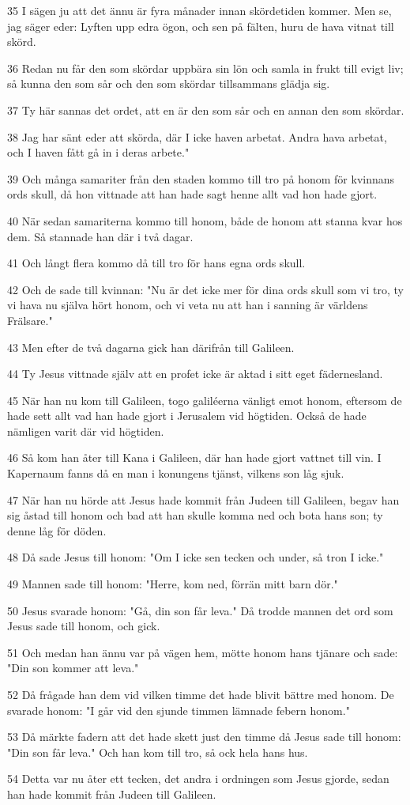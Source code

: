 \par 35 I sägen ju att det ännu är fyra månader innan skördetiden kommer. Men se, jag säger eder: Lyften upp edra ögon, och sen på fälten, huru de hava vitnat till skörd.
\par 36 Redan nu får den som skördar uppbära sin lön och samla in frukt till evigt liv; så kunna den som sår och den som skördar tillsammans glädja sig.
\par 37 Ty här sannas det ordet, att en är den som sår och en annan den som skördar.
\par 38 Jag har sänt eder att skörda, där I icke haven arbetat. Andra hava arbetat, och I haven fått gå in i deras arbete."
\par 39 Och många samariter från den staden kommo till tro på honom för kvinnans ords skull, då hon vittnade att han hade sagt henne allt vad hon hade gjort.
\par 40 När sedan samariterna kommo till honom, både de honom att stanna kvar hos dem. Så stannade han där i två dagar.
\par 41 Och långt flera kommo då till tro för hans egna ords skull.
\par 42 Och de sade till kvinnan: "Nu är det icke mer för dina ords skull som vi tro, ty vi hava nu själva hört honom, och vi veta nu att han i sanning är världens Frälsare."
\par 43 Men efter de två dagarna gick han därifrån till Galileen.
\par 44 Ty Jesus vittnade själv att en profet icke är aktad i sitt eget fädernesland.
\par 45 När han nu kom till Galileen, togo galiléerna vänligt emot honom, eftersom de hade sett allt vad han hade gjort i Jerusalem vid högtiden. Också de hade nämligen varit där vid högtiden.
\par 46 Så kom han åter till Kana i Galileen, där han hade gjort vattnet till vin. I Kapernaum fanns då en man i konungens tjänst, vilkens son låg sjuk.
\par 47 När han nu hörde att Jesus hade kommit från Judeen till Galileen, begav han sig åstad till honom och bad att han skulle komma ned och bota hans son; ty denne låg för döden.
\par 48 Då sade Jesus till honom: "Om I icke sen tecken och under, så tron I icke."
\par 49 Mannen sade till honom: "Herre, kom ned, förrän mitt barn dör."
\par 50 Jesus svarade honom: "Gå, din son får leva." Då trodde mannen det ord som Jesus sade till honom, och gick.
\par 51 Och medan han ännu var på vägen hem, mötte honom hans tjänare och sade: "Din son kommer att leva."
\par 52 Då frågade han dem vid vilken timme det hade blivit bättre med honom. De svarade honom: "I går vid den sjunde timmen lämnade febern honom."
\par 53 Då märkte fadern att det hade skett just den timme då Jesus sade till honom: "Din son får leva." Och han kom till tro, så ock hela hans hus.
\par 54 Detta var nu åter ett tecken, det andra i ordningen som Jesus gjorde, sedan han hade kommit från Judeen till Galileen.

